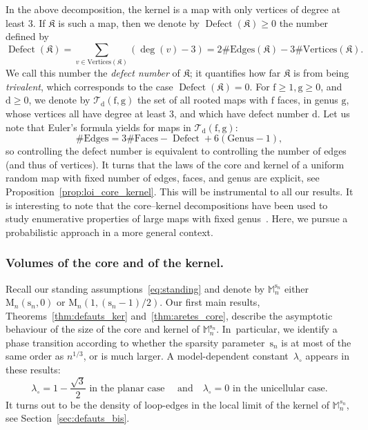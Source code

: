 \documentclass[10pt]{amsart}
\theoremstyle{plain}
\theoremstyle{definition}
\theoremstyle{remark}
\newcommand{\Map}{\mathrm{M}}
\newcommand{\Mapb}{\mathbb{M}}
\newcommand{\face}{\mathrm{f}}
\newcommand{\defect}{\mathrm{d}}
\newcommand{\gen}{\mathrm{g}}
\newcommand{\spar}{\mathrm{s}}
\DeclareMathOperator{\Defect}{Defect}
\begin{document}
In the above decomposition, the kernel is a map with only vertices of degree at least $3$. If $\mathfrak{K}$ is such a map, then we denote by $\Defect(\mathfrak{K}) \ge 0$ the number defined by
\[
\Defect(\mathfrak{K}) = \sum_{v \in \mathrm{Vertices}(\mathfrak{K})} (\deg(v)-3)
= 2\#\mathrm{Edges}(\mathfrak{K}) - 3\#\mathrm{Vertices}(\mathfrak{K}).
\]
We call this number the \emph{defect number} of $\mathfrak{K}$; it quantifies how far $\mathfrak{K}$ is from being \emph{trivalent}, which corresponds to the case $\Defect(\mathfrak{K}) = 0$.
For $\face \geq 1, \gen \geq 0$, and $\defect \geq 0$, we denote by $\mathcal{T}_{\defect}(\face, \gen)$ the set of all rooted maps with $ \face$ faces, in genus $ \gen$, whose vertices all have degree at least $3$, and which have defect number $\defect$. Let us note that Euler's formula yields for maps in $\mathcal{T}_{\defect}(\face, \gen)$:
\begin{equation}\label{eq:Euler_defauts}
\#\mathrm{Edges} = 3\#\mathrm{Faces} - \Defect + 6(\mathrm{Genus}-1),
\end{equation}
so controlling the defect number is equivalent to controlling the number of edges (and thus of vertices). It turns that the laws of the core and kernel of a uniform random map with fixed number of edges, faces, and genus are explicit, see Proposition~\ref{prop:loi_core_kernel}. This will be instrumental to all our results. It is interesting to note that the core--kernel decompositions have been used to study enumerative properties of large maps with fixed genus~\cite{CMS09,Cha10}. Here, we pursue a probabilistic approach in a more general context.

\subsubsection*{Volumes of the core and of the kernel.}
Recall our standing assumptions~\eqref{eq:standing} and denote by $ \Mapb_{n}^{\spar_{n}}$ either $ \Map_{n}(\spar_{n},0)$ or $ \Map_{n}(1,(\spar_{n}-1)/2)$. Our first main results, Theorems~\ref{thm:defauts_ker} and~\ref{thm:aretes_core}, describe the asymptotic behaviour of the size of the core and kernel of $ \Mapb_{n}^{\spar_{n}}$. In~particular, we identify a phase transition according to whether the sparsity parameter~$\spar_{n}$ is at most of the same order as $n^{1/3}$, or is much larger.
A model-dependent constant~$\lambda_\circ$ appears in these results:
\begin{equation}\label{eq:lambda}
\lambda_\circ = 1-\frac{\sqrt{3}}{2}\text{ in the planar case }
\quad\text{and}\quad
\lambda_\circ = 0\text{ in the unicellular case}.
\end{equation}
It turns out to be the density of loop-edges in the local limit of the kernel of $ \Mapb_n^{s_n}$, see Section~\ref{sec:defauts_bis}.
\end{document}
